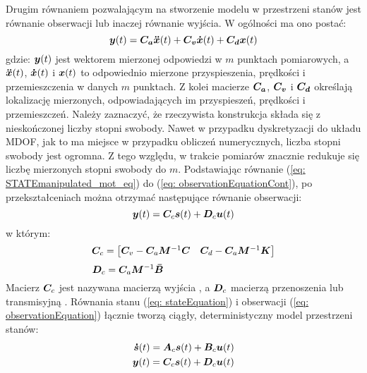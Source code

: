Drugim równaniem pozwalającym na stworzenie modelu w przestrzeni stanów jest równanie obserwacji  lub inaczej równanie wyjścia. W ogólności ma ono postać:
\begin{equation} \label{eq: observationEquationCont}
	\bm{y}(t) = \bm{C_a}\bm{\ddot{x}}(t) + \bm{C_v}\bm{\dot{x}}(t) +\bm{C_d}\bm{x}(t)
\end{equation}
gdzie: $\bm{y}(t)$ jest wektorem mierzonej odpowiedzi w $m$ punktach pomiarowych, a $\bm{\ddot{x}}(t)$, $\bm{\dot{x}}(t)$ i $\bm{x}(t)$ to odpowiednio mierzone przyspieszenia, prędkości i przemieszczenia w danych $m$ punktach. Z kolei macierze $\bm{C_a}$, $\bm{C_v}$ i $\bm{C_d}$ określają lokalizację mierzonych, odpowiadających im przyspieszeń, prędkości i przemieszczeń. Należy zaznaczyć, że rzeczywista konstrukcja składa się z nieskończonej liczby stopni swobody. Nawet w przypadku dyskretyzacji do układu MDOF, jak to ma miejsce w przypadku obliczeń numerycznych, liczba stopni swobody jest ogromna. Z tego względu, w trakcie pomiarów znacznie redukuje się liczbę mierzonych stopni swobody do $m$. Podstawiając równanie (\ref{eq: STATEmanipulated_mot_eq}) do (\ref{eq: observationEquationCont}), po przekształceniach można otrzymać następujące równanie obserwacji:
\begin{equation} \label{eq: observationEquation}
	\bm{y}(t) = \bm{C}_c\bm{s}(t)+\bm{D}_c\bm{u}(t)
\end{equation}
w którym:
\begin{equation}
	\bm{C}_c = 
	\begin{bmatrix} 
		\bm{C}_v-\bm{C}_a\bm{M}^{-1}\bm{C}  &  \bm{C}_d-\bm{C}_a\bm{M}^{-1}\bm{K}
	\end{bmatrix}
\end{equation}
\begin{equation}
	\bm{D}_c = \bm{C}_a\bm{M}^{-1}\bm{\bar{B}} \phantom{\qquad\qquad\qquad\qquad\qquad\quad.}
\end{equation}
Macierz $\bm{C}_c$ jest nazywana macierzą wyjścia , a $\bm{D}_c$ macierzą przenoszenia lub transmisyjną . Równania stanu (\ref{eq: stateEquation}) i obserwacji (\ref{eq: observationEquation}) łącznie tworzą ciągły, deterministyczny model przestrzeni stanów:
\begin{equation} \label{eq: con_state_space_model}
	\begin{aligned}
		\bm{\dot{s}}(t)= \bm{A}_c\bm{s}(t)+\bm{B}_c\bm{u}(t) \\
		\bm{y}(t) = \bm{C}_c\bm{s}(t)+\bm{D}_c\bm{u}(t)
	\end{aligned}
\end{equation}

